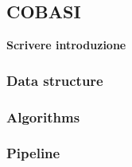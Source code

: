 \documentclass[../main.tex]{subfiles}
\begin{document}
\subsection{COBASI}
\label{cobasi}

\textbf{Scrivere introduzione}

\subsubsection{Data structure}
\subsubsection{Algorithms}
\subsubsection{Pipeline}
\end{document}
